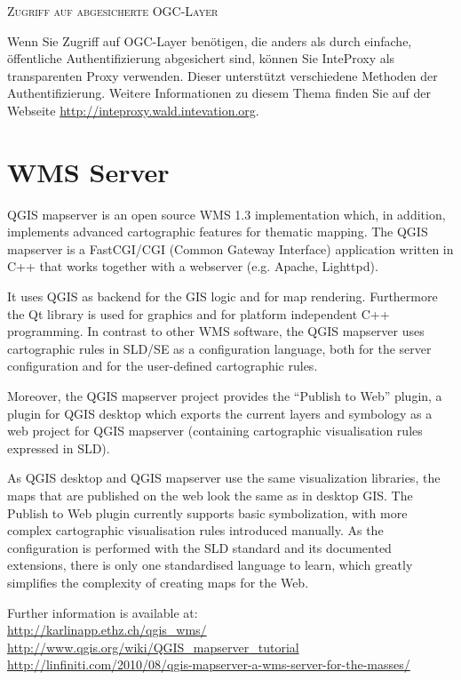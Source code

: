 \begin{Tip}[ht]\caption{\textsc{Zugriff auf abgesicherte OGC-Layer}}
Wenn Sie Zugriff auf OGC-Layer benötigen, die anders als durch
einfache, öffentliche Authentifizierung abgesichert sind, können Sie
InteProxy als transparenten Proxy verwenden. Dieser unterstützt verschiedene
Methoden der Authentifizierung. Weitere Informationen zu diesem Thema finden
Sie auf der Webseite \url{http://inteproxy.wald.intevation.org}.
\end{Tip}

%
%

\section{WMS Server}\label{sec:ogc-wmsserver}

QGIS mapserver is an open source WMS 1.3 implementation which, in addition,
implements advanced cartographic features for thematic mapping. The QGIS
mapserver is a FastCGI/CGI (Common Gateway Interface) application written in
C++ that works together with a webserver (e.g. Apache, Lighttpd). 


It uses QGIS as backend for the GIS logic and for map rendering. Furthermore the 
Qt library is used for graphics and for platform independent 
C++ programming. In contrast to other WMS software, the QGIS mapserver uses 
cartographic rules in SLD/SE as a configuration language, both for the server 
configuration and for the user-defined cartographic rules. 

Moreover, the QGIS mapserver project provides the “Publish to Web” plugin, a 
plugin for QGIS desktop which exports the current layers and symbology as a 
web project for QGIS mapserver (containing cartographic visualisation rules 
expressed in SLD).

As QGIS desktop and QGIS mapserver use the same visualization libraries, the
maps that are published on the web look the same as in desktop GIS. The 
Publish to Web plugin currently supports basic symbolization, with more complex 
cartographic visualisation rules introduced manually. As the configuration is 
performed with the SLD standard and its documented extensions, there is only 
one standardised language to learn, which greatly simplifies the complexity 
of creating maps for the Web.

Further information is available at: \\
\url{http://karlinapp.ethz.ch/qgis\_wms/} \\
\url{http://www.qgis.org/wiki/QGIS\_mapserver\_tutorial} \\
\url{http://linfiniti.com/2010/08/qgis-mapserver-a-wms-server-for-the-masses/}


